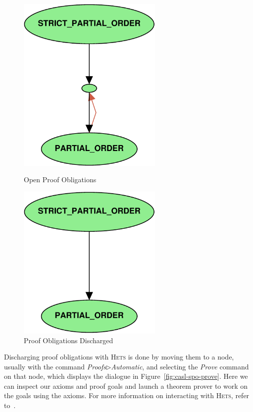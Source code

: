 \documentclass[11pt]{article}
\newcommand{\Hets}{\textsc{Hets}}
\begin{document}
\begin{figure}
  \begin{minipage}[b]{0.5\textwidth}
    \begin{centering}
	    \includegraphics[width=7cm]{SPO_before.pdf}
	    \caption{Open Proof Obligations}\label{fig:casl-spo-before}
    \end{centering}
  \end{minipage}
  \begin{minipage}[b]{0.5\textwidth}
    \begin{centering}
	    \includegraphics[width=7cm]{SPO_after.pdf}
	    \caption{Proof Obligations Discharged}\label{fig:casl-spo-after}
    \end{centering}
  \end{minipage}
\end{figure}

Discharging proof obligations with \Hets{} is done by moving them to a node, usually with the command \emph{Proofs$\rhd$Automatic}, and selecting the \emph{Prove} command on that node, which displays the dialogue in Figure~\ref{fig:casl-spo-prove}. Here we can inspect our axioms and proof goals and launch a theorem prover to work on the goals using the axioms. For more information on interacting with \Hets{}, refer to~\cite{Mossakowski:2006b}.
\end{document}
